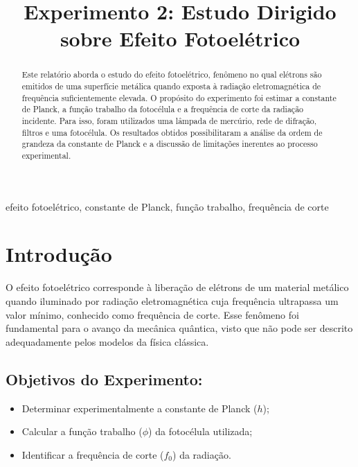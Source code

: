 \documentclass[conference]{IEEEtran}
\title{\color{primaryBlue}Experimento 2: Estudo Dirigido sobre Efeito Fotoelétrico}
\author{
\IEEEauthorblockN{Larissa Simões – 232028230}
\IEEEauthorblockA{Turma 01}
\and
\IEEEauthorblockN{Thiago Ferreira – 231025717}
\IEEEauthorblockA{Turma 01}
}
\begin{document}
\maketitle

\begin{abstract}
Este relatório aborda o estudo do efeito fotoelétrico, fenômeno no qual elétrons são emitidos de uma superfície metálica quando exposta à radiação eletromagnética de frequência suficientemente elevada. O propósito do experimento foi estimar a constante de Planck, a função trabalho da fotocélula e a frequência de corte da radiação incidente. Para isso, foram utilizados uma lâmpada de mercúrio, rede de difração, filtros e uma fotocélula. Os resultados obtidos possibilitaram a análise da ordem de grandeza da constante de Planck e a discussão de limitações inerentes ao processo experimental.
\end{abstract}

\begin{IEEEkeywords}
efeito fotoelétrico, constante de Planck, função trabalho, frequência de corte
\end{IEEEkeywords}

\section{Introdução}
O efeito fotoelétrico corresponde à liberação de elétrons de um material metálico quando iluminado por radiação eletromagnética cuja frequência ultrapassa um valor mínimo, conhecido como frequência de corte. Esse fenômeno foi fundamental para o avanço da mecânica quântica, visto que não pode ser descrito adequadamente pelos modelos da física clássica.

\subsection{Objetivos do Experimento:}

\begin{itemize}
    \item Determinar experimentalmente a constante de Planck ($h$);
    \item Calcular a função trabalho ($\phi$) da fotocélula utilizada;
    \item Identificar a frequência de corte ($f_0$) da radiação.
\end{itemize}
\end{document}
